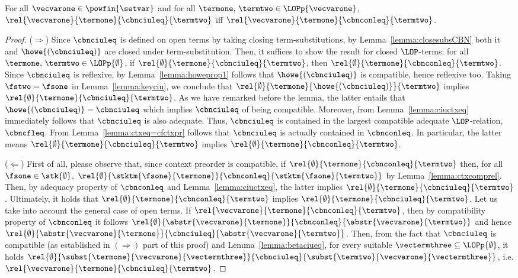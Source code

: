 \begin{theorem}\label{thm:ciupr=ctxpr}
  For all $\vecvarone\in\powfin{\setvar}$ and for all
  $\termone,\,\termtwo\in\LOPp{\vecvarone}$,
  $\rel{\vecvarone}{\termone}{\cbnciuleq}{\termtwo}$ iff
  $\rel{\vecvarone}{\termone}{\cbnconleq}{\termtwo}$.
\end{theorem}
\begin{proof}
  ($\Rightarrow$) Since $\cbnciuleq$ is defined on open terms by taking
  closing term-substitutions, by Lemma~\ref{lemma:closesubsCBN} both it and
  $\howe{(\cbnciuleq)}$ are closed under term-substitution. Then, it
  suffices to show the result for closed $\LOP$-terms: for all
  $\termone,\,\termtwo\in\LOPp{\emptyset}$, if
  $\rel{\emptyset}{\termone}{\cbnciuleq}{\termtwo}$, then
  $\rel{\emptyset}{\termone}{\cbnconleq}{\termtwo}$.  Since $\cbnciuleq$ is
  reflexive, by Lemma~\ref{lemma:howeprop1} follows that
  $\howe{(\cbnciuleq)}$ is compatible, hence reflexive too. Taking $\fstwo
  = \fsone$ in Lemma~\ref{lemma:keyciu}, we conclude that
  $\rel{\emptyset}{\termone}{\howe{(\cbnciuleq)}}{\termtwo}$ implies
  $\rel{\emptyset}{\termone}{\cbnciuleq}{\termtwo}$. As we have remarked
  before the lemma, the latter entails that $\howe{(\cbnciuleq)} =
  \cbnciuleq$ which implies $\cbnciuleq$ of being compatible. Moreover,
  from Lemma~\ref{lemma:ciuctxeq} immediately follows that $\cbnciuleq$ is
  also adequate. Thus, $\cbnciuleq$ is contained in the largest compatible
  adequate $\LOP$-relation, $\cbncfleq$. From
  Lemma~\ref{lemma:ctxeq=cfctxpr} follows that $\cbnciuleq$ is actually
  contained in $\cbnconleq$. In particular, the latter means
  $\rel{\emptyset}{\termone}{\cbnciuleq}{\termtwo}$ implies
  $\rel{\emptyset}{\termone}{\cbnconleq}{\termtwo}$.

  ($\Leftarrow$) First of all, please observe that, since context
  preorder is compatible, if
  $\rel{\emptyset}{\termone}{\cbnconleq}{\termtwo}$ then, for all
  $\fsone\in\stk{\emptyset}$,
  $\rel{\emptyset}{\stktm{\fsone}{\termone}}{\cbnconleq}{\stktm{\fsone}{\termtwo}}$
  by Lemma~\ref{lemma:ctxcomprel}. Then, by adequacy property of
  $\cbnconleq$ and Lemma~\ref{lemma:ciuctxeq}, the latter implies
  $\rel{\emptyset}{\termone}{\cbnciuleq}{\termtwo}$. Ultimately, it holds
  that $\rel{\emptyset}{\termone}{\cbnconleq}{\termtwo}$ implies
  $\rel{\emptyset}{\termone}{\cbnciuleq}{\termtwo}$. Let us take into
  account the general case of open terms.  If
  $\rel{\vecvarone}{\termone}{\cbnconleq}{\termtwo}$, then by compatibility
  property of $\cbnconleq$ it follows
  $\rel{\emptyset}{\abstr{\vecvarone}{\termone}}{\cbnconleq}{\abstr{\vecvarone}{\termtwo}}$
  and hence
  $\rel{\emptyset}{\abstr{\vecvarone}{\termone}}{\cbnciuleq}{\abstr{\vecvarone}{\termtwo}}$. Then,
  from the fact that $\cbnciuleq$ is compatible (as established in
  $(\Rightarrow)$ part of this proof) and Lemma~\ref{lemma:betaciueq}, for
  every suitable $\vectermthree\subseteq\LOPp{\emptyset}$, it holds
  $\rel{\emptyset}{\subst{\termone}{\vecvarone}{\vectermthree}}{\cbnciuleq}{\subst{\termtwo}{\vecvarone}{\vectermthree}}$,
  i.e. $\rel{\vecvarone}{\termone}{\cbnciuleq}{\termtwo}$.
\end{proof}

